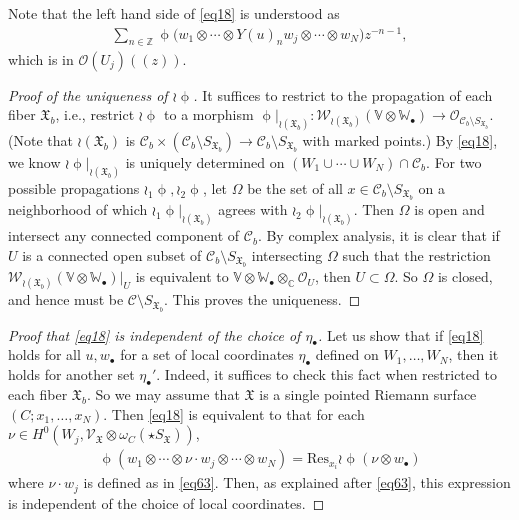 \documentclass[12pt,a4paper,notitlepage]{article}
\theoremstyle{definition}
\theoremstyle{plain}
\newcommand{\fk}{\mathfrak}
\newcommand{\mc}{\mathcal}
\newcommand{\Res}{\mathrm{Res}}
\newcommand{\scr}{\mathscr}
\newcommand{\SX}{{S_{\fk X}}}
\newcommand{\blt}{\bullet}
\newcommand{\Vbb}{\mathbb V}
\newcommand{\Wbb}{\mathbb W}
\newcommand{\Cbb}{\mathbb C}
\newcommand{\Zbb}{\mathbb Z}
\newcommand{\SXb}{{S_{\fk X_b}}}
\numberwithin{equation}{section}
\begin{document}
Note that the left hand side of \eqref{eq18} is understood as
\begin{align*}
\sum_{n\in\Zbb} \upphi\big(w_1\otimes\cdots\otimes Y(u)_nw_j\otimes\cdots\otimes w_N\big)z^{-n-1},
\end{align*}
which is in $\scr O(U_j)((z))$. 

\begin{proof}[Proof of the uniqueness of $\wr\upphi$]
It suffices to restrict to the propagation of each fiber $\fk X_b$, i.e., restrict $\wr\upphi$ to a morphism $\upphi|_{\wr(\fk X_b)}:\scr W_{\wr(\fk X_b)}(\Vbb\otimes\Wbb_\blt)\rightarrow\scr O_{\mc C_b\setminus \SXb}$.	(Note that $\wr(\fk X_b)$ is $\mc C_b\times(\mc C_b\setminus\SXb)\rightarrow\mc C_b\setminus\SXb$ with marked points.) By \eqref{eq18}, we know $\wr\upphi|_{\wr(\fk X_b)}$ is uniquely determined on $(W_1\cup\cdots\cup W_N)\cap\mc C_b$. For two possible propagations $\wr_1\upphi,\wr_2\upphi$, let $\Omega$ be the set of all $x\in\mc C_b\setminus\SXb$ on a neighborhood of which $\wr_1\upphi|_{\wr(\fk X_b)}$ agrees with $\wr_2\upphi|_{\wr(\fk X_b)}$. Then $\Omega$ is open and  intersect any connected component of $\mc C_b$. By complex analysis, it is clear that if $U$ is a connected open subset of $\mc C_b\setminus\SXb$ intersecting $\Omega$ such that the restriction $\scr W_{\wr(\fk X_b)}(\Vbb\otimes\Wbb_\blt)|_U$ is equivalent to $\Vbb\otimes\Wbb_\blt\otimes_\Cbb\scr O_U$, then $U\subset\Omega$. So $\Omega$ is closed, and hence must be $\mc C\setminus\SXb$. This proves the uniqueness.
\end{proof}

\begin{proof}[Proof that \eqref{eq18} is independent of the choice of $\eta_\blt$]
Let us show that if \eqref{eq18} holds for all $u,w_\blt$ for a set of local coordinates $\eta_\blt$ defined on $W_1,\dots,W_N$, then it holds for another set $\eta_\blt'$. Indeed, it suffices to check this fact when restricted to each fiber $\fk X_b$. So we may assume that $\fk X$ is a single pointed Riemann surface $(C;x_1,\dots,x_N)$. Then \eqref{eq18} is equivalent to that for each $\nu\in H^0(W_j,\scr V_{\fk X}\otimes\omega_C(\star\SX))$, 
\begin{align*}
\upphi (w_1\otimes\cdots\otimes\nu\cdot w_j\otimes\cdots\otimes w_N)=\Res_{x_i}\wr\upphi(\nu\otimes w_\blt)
\end{align*}
where $\nu\cdot w_j$ is defined as in \eqref{eq63}. Then, as explained after \eqref{eq63}, this expression is independent of the choice of local coordinates.
\end{proof}
\end{document}
